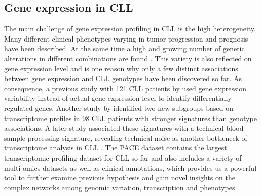 \FloatBarrier

\subsection{Gene expression in CLL}
The main challenge of gene expression profiling in CLL is the high heterogeneity. Many different clinical phenotypes varying in tumor progression and prognosis have been described. At the same time a high and growing number of genetic alterations in different combinations are found \citep{Landau2015}. This variety is also reflected on gene expression level and is one reason why only a few distinct associations between gene expression and CLL genotypes have been discovered so far. As consequence, a previous study with 121 CLL patients by \citet{Ecker2015} used gene expression variability instead of actual gene expression level to identify differentially regulated genes. Another study by \citet{Ferreira2014} identified two new subgroups based on transcriptome profiles in 98 CLL patients with stronger signatures than genotype associations. A later study associated these signatures with a technical blood sample processing signature, revealing technical noise as another bottleneck of transcriptome analysis in CLL \citep{Dvinge2014}. The PACE dataset contains the largest transcriptomic profiling dataset for CLL so far and also includes a variety of multi-omics datasets as well as clinical annotations, which provides us a powerful tool to further examine previous hypothesis and gain novel insights on the complex networks among genomic variation, transcription and phenotypes.










